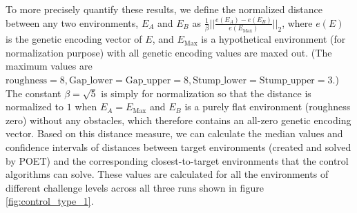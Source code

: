 \documentclass{article}
\newcommand{\jc}[1]{\comments{\textcolor{deepForestGreen}{[JC: #1]}}}
\newcommand{\ks}[1]{\comments{\textcolor{purple}{[Ken: #1]}}}
\newcommand{\rw}[1]{\comments{\textcolor{blue}{[Rui: #1]}}}
\newcommand{\comments}[1]{#1}
\begin{document}

To more precisely quantify these results, we define the normalized distance between any two environments, $E_{A}$ and $E_{B}$ as
$ \frac{1}{\beta}\vert\vert{\frac{e(E_{A}) - e( E_{B})}{e(E_{\textrm{Max}})}}\vert\vert_{2}$, where $e(E)$ is the genetic encoding vector of $E$, and $E_{\textrm{Max}}$ is a hypothetical environment (for normalization purpose) with all genetic encoding values are maxed out. (The maximum values are $\textrm{roughness} = 8, \textrm{Gap\_lower}=\textrm{Gap\_upper} = 8, \textrm{Stump\_lower} = \textrm{Stump\_upper} = 3$.)
The constant $\beta = \sqrt{5}$ is simply for normalization so that the distance is normalized to $1$ when $E_{A} = E_{\textrm{Max}}$ and $E_{B}$ is a purely flat environment (roughness zero) without any obstacles, which therefore contains an all-zero genetic encoding vector. 
Based on this distance measure, we can calculate the median values and confidence intervals of distances between target environments (created and solved by POET) and the corresponding closest-to-target environments that the control algorithms can solve. 
These values are calculated for all the environments of different challenge levels across all three runs shown in figure \ref{fig:control_type_1}. 
\end{document}
